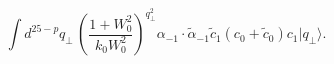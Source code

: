 \begin{equation} %
\int d^{25-p}q_{\bot}\,
   \left(\frac{1+W_0^2}{k_0 W_0^2} \right)^{q_{\bot}^2}
\alpha_{-1} \cdot \tilde{\alpha}_{-1} \tilde{c}_{1} (c_0+\tilde{c}_0) c_1
|q_{\bot}\rangle.
\end{equation} 
